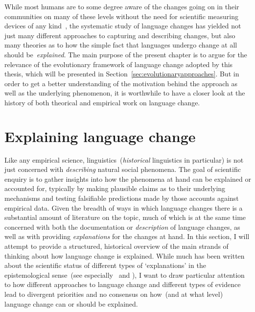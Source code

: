 While most humans are to some degree aware of the changes going on in their communities on many of these levels without the need for scientific measuring devices of any kind~\citep{Labov2001,Tagliamonte2012}, the systematic study of language changes has yielded not just many different approaches to capturing and describing changes, but also many theories as to how the simple fact that languages undergo change at all should be~\emph{explained}.
The main purpose of the present chapter is to argue for the relevance of the evolutionary framework of language change adopted by this thesis, which will be presented in Section~\ref{sec:evolutionaryapproaches}.
But in order to get a better understanding of the motivation behind the approach as well as the underlying phenomenon, it is worthwhile to have a closer look at the history of both theorical and empirical work on language change.

\section{Explaining language change}

Like any empirical science, linguistics~(\emph{historical} linguistics in particular) is not just concerned with \emph{describing} natural social phenomena. The goal of scientific enquiry is to gather insights into how the phenomena at hand can be explained or accounted for, typically by making plausible claims as to their underlying mechanisms and testing falsifiable predictions made by those accounts against empirical data. Given the breadth of ways in which language changes there is a substantial amount of literature on the topic, much of which is at the same time concerned with both the documentation or \emph{description} of language changes, as well as with providing \emph{explanations} for the changes at hand.
In this section, I will attempt to provide a structured, historical overview of the main strands of thinking about how language change is explained. While much has been written about the scientific status of different types of `explanations' in the epistemological sense~(see especially~\citealt{Lass1980,McMahon1994} and \citealt[ch.3]{Newmeyer1998}), I want to draw particular attention %
to how different approaches to language change and different types of evidence lead to divergent priorities and no consensus on how~(and at what level) language change can or should be explained.


